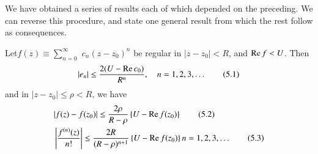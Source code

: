 \medskip
{}
We have obtained a series of results each of which depended on the
preceding. We can reverse this procedure, and state one general result
from which the rest follow as consequences.

\begin{thm}\label{chap3:thm5}
\cite[p.50]{key11} Let\pageoriginale $f(z) \equiv \sum\limits^\infty_{n=0}$ $c_n (z-z_0)^n$
be regular in $|z-z_0| <R$, and $\operatorname{Re} f < U$. Then
\begin{equation*}
|e_n| \leq \frac{2(U - \operatorname{Re} c_0)}{R^n}, \quad n = 1,2,3, \ldots \tag{5.1}\label{c3:eq5.1}
\end{equation*}
and in $|z-z_0| \leq \rho <R$, we have
\begin{align*}
& |f(z) - f(z_0)| \leq \frac{2\rho}{R - \rho} \left\{ U - \operatorname{Re}
  f(z_0)\right\} \tag{5.2}\label{c3:eq5.2}\\
& \left|\frac{f^{(n)} (z)}{n!} \right| \leq \frac{2R}{(R-\rho)^{n+1}}
  \left\{ U - \operatorname{Re} f(z_0) \right\} n = 1,2,3, \ldots \tag{5.3}\label{c3:eq5.3}
\end{align*}
\end{thm}

